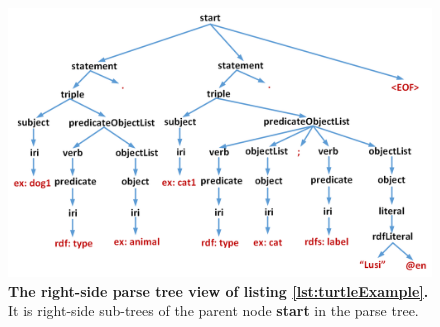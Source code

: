\begin{figure}
		\includegraphics[width=1\linewidth]{images/implementationParseTreeRight.png}
	\caption{\textbf{The right-side parse tree view of listing \ref{lst:turtleExample}.} It is right-side sub-trees of the parent node \textbf{start} in the parse tree.}
	\label{Fig:implementationParseTreeRight}

\end{figure}


